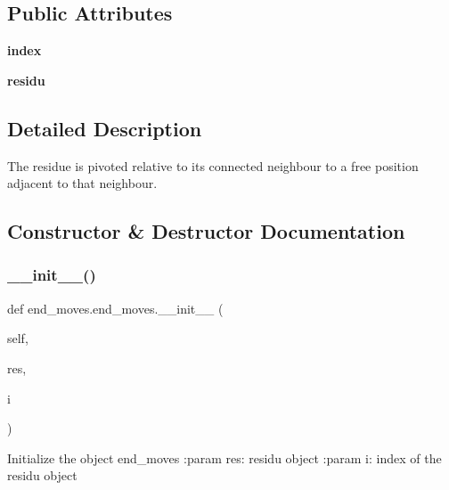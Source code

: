 \subsection*{Public Attributes}
\begin{DoxyCompactItemize}
\item 
\mbox{\label{classend__moves_1_1end__moves_a35b63bb85c918a47bd9ad7247df8b99b}} 
{\bfseries index}
\item 
\mbox{\label{classend__moves_1_1end__moves_a19dbe2b32973821ca27ecd9a3c4e1caa}} 
{\bfseries residu}
\end{DoxyCompactItemize}


\subsection{Detailed Description}
\begin{DoxyVerb}The residue is pivoted relative to its connected
neighbour to a free position adjacent to that neighbour.
\end{DoxyVerb}
 

\subsection{Constructor \& Destructor Documentation}
\mbox{\label{classend__moves_1_1end__moves_a51b866345b6fb9f3679406b7e26f8d9e}} 
\subsubsection{\texorpdfstring{\+\_\+\+\_\+init\+\_\+\+\_\+()}{\_\_init\_\_()}}
{\footnotesize\ttfamily def end\+\_\+moves.\+end\+\_\+moves.\+\_\+\+\_\+init\+\_\+\+\_\+ (\begin{DoxyParamCaption}\item[{}]{self,  }\item[{}]{res,  }\item[{}]{i }\end{DoxyParamCaption})}

\begin{DoxyVerb}Initialize the object end_moves
    :param res: residu object
    :param   i: index of the residu object
\end{DoxyVerb}
 

